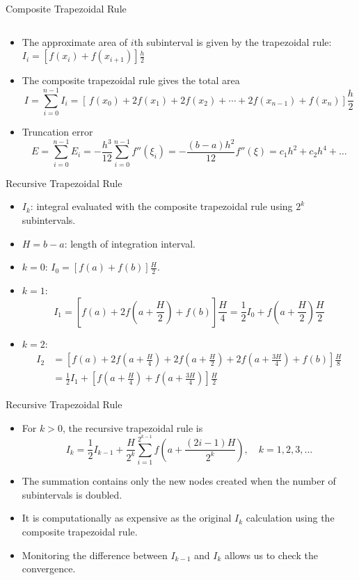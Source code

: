 \documentclass{beamer}
\newcommand{\beforeverb}{\footnotesize}
\newcommand{\afterverb}{\normalsize}
\begin{document}
\begin{frame}{Composite Trapezoidal Rule}
\begin{columns}
\end{columns}

\begin{itemize}
\item The approximate area of $i$th subinterval is given by the trapezoidal rule: 
$I_i=[f(x_i)+f(x_{i+1}) ]\frac{h}{2}$
\item The \alert{composite trapezoidal rule} gives the total area 
\beforeverb
\[
I=\sum_{i=0}^{n-1} I_i =[\,f(x_0)+2f(x_1)+2f(x_2)+\cdots+2f(x_{n-1}) +f(x_n)]\frac{h}{2}
\]
\afterverb
\item Truncation error 
\beforeverb
\[
E=\sum_{i=0}^{n-1}E_i=-\frac{h^3}{12}\sum_{i=0}^{n-1}f''(\xi_i)=-\frac{(b-a)h^2}{12}f''(\xi)=c_1h^2+c_2h^4 + \ldots
\]
\afterverb
\end{itemize}
\end{frame}
\begin{frame}{Recursive Trapezoidal Rule}
\begin{itemize}
\item $I_k$: integral evaluated with the composite trapezoidal rule using $2^{k}$ subintervals.
\item $H=b-a$: length of integration interval.
\item $k=0$: $I_0=[f(a)+f(b)]\frac{H}{2}$.
\item $k=1$:
\beforeverb
\[
I_1=\left[f(a)+2f\left(a+\frac{H}{2}\right)+f(b)\right]\frac{H}{4}=\frac{1}{2}I_0+f\left(a+\frac{H}{2}\right)\frac{H}{2}
\]
\afterverb
\item $k=2$:
\beforeverb
\begin{align*}
I_2&=\left[f(a)+2f\left(a+\frac{H}{4}\right)+2f\left(a+\frac{H}{2}\right)+2f\left(a+\frac{3H}{4}\right)+f(b)\right]\frac{H}{8}\\
&=\frac{1}{2}I_1+\left[f\left(a+\frac{H}{4}\right)+f\left(a+\frac{3H}{4}\right)\right]\frac{H}{2}
\end{align*}
\afterverb
\end{itemize}
\end{frame}
\begin{frame}{Recursive Trapezoidal Rule}
\begin{itemize}
\item For $k>0$, the \alert{recursive trapezoidal rule} is
\[
I_k=\frac{1}{2}I_{k-1}+\frac{H}{2^{k}}\sum_{i=1}^{2^{k-1}}f\left(a+\frac{(2i-1)H}{2^{k}}\right), \quad k=1,2,3,\ldots
\]
\afterverb
\item The summation contains only the \alert{new nodes} created when the number of subintervals is doubled. 
\item It is computationally as expensive as the original $I_k$ calculation using the composite trapezoidal rule.
\item Monitoring the difference between $I_{k-1}$ and  $I_k$ allows us to check the convergence.  
\end{itemize}

\end{frame}
\end{document}
